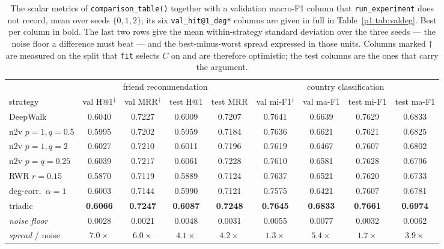 \begin{table}[H]
\centering\footnotesize
\caption{The scalar metrics of \texttt{comparison\_table()} together with a validation
macro-F1 column that \texttt{run\_experiment} does not record, mean over seeds
$\{0,1,2\}$; its six \texttt{val\_hit@1\_deg*} columns are given in full in
Table~\ref{p1:tab:valdeg}.  Best per column in bold.  The last two rows give the mean
within-strategy standard deviation over the three seeds --- the noise floor a difference
must beat --- and the best-minus-worst spread expressed in those units.  Columns marked
$\dagger$ are measured on the split that \texttt{fit} selects $C$ on and are therefore
optimistic; the test columns are the ones that carry the argument.}
\label{p1:tab:comparison}
\setlength{\tabcolsep}{3.2pt}
\begin{tabular}{@{}lcccccccc@{}}
\toprule
& \multicolumn{4}{c}{friend recommendation} & \multicolumn{4}{c}{country classification} \\
\cmidrule(lr){2-5}\cmidrule(lr){6-9}
strategy & val H@1$^\dagger$ & val MRR$^\dagger$ & test H@1 & test MRR & val mi-F1$^\dagger$ & val ma-F1 & test mi-F1 & test ma-F1 \\
\midrule
DeepWalk & 0.6040 & 0.7227 & 0.6009 & 0.7207 & 0.7641 & 0.6639 & 0.7629 & 0.6833 \\
n2v $p{=}1,q{=}0.5$ & 0.5995 & 0.7202 & 0.5959 & 0.7184 & 0.7636 & 0.6621 & 0.7621 & 0.6825 \\
n2v $p{=}1,q{=}2$ & 0.6027 & 0.7210 & 0.6011 & 0.7196 & 0.7619 & 0.6467 & 0.7607 & 0.6802 \\
n2v $p{=}q{=}0.25$ & 0.6039 & 0.7217 & 0.6061 & 0.7228 & 0.7610 & 0.6581 & 0.7628 & 0.6796 \\
RWR $r{=}0.15$ & 0.5870 & 0.7119 & 0.5889 & 0.7124 & 0.7637 & 0.6521 & 0.7620 & 0.6733 \\
deg-corr.\ $\alpha{=}1$ & 0.6003 & 0.7144 & 0.5990 & 0.7121 & 0.7575 & 0.6421 & 0.7607 & 0.6781 \\
triadic & \textbf{0.6066} & \textbf{0.7247} & \textbf{0.6087} & \textbf{0.7248} & \textbf{0.7645} & \textbf{0.6833} & \textbf{0.7661} & \textbf{0.6974} \\
\midrule
\textit{noise floor} & 0.0028 & 0.0021 & 0.0048 & 0.0031 & 0.0055 & 0.0077 & 0.0032 & 0.0062 \\
\textit{spread} / noise & $7.0\times$ & $6.0\times$ & $4.1\times$ & $4.2\times$ & $1.3\times$ & $5.4\times$ & $1.7\times$ & $3.9\times$ \\
\bottomrule
\end{tabular}
\end{table}

